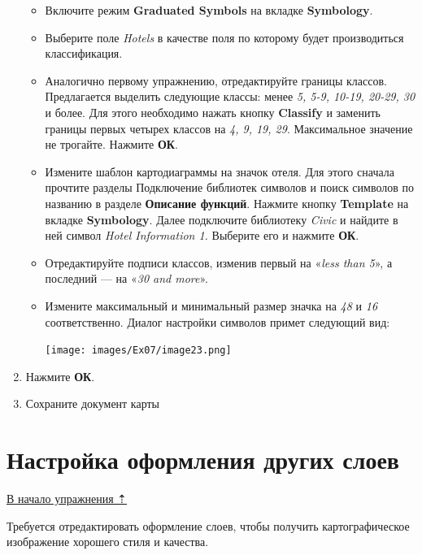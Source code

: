 \documentclass[12pt,]{book}
\begin{document}
\begin{enumerate}
  \begin{itemize}
  \item
    Включите режим \textbf{Graduated Symbols} на вкладке \textbf{Symbology}.
  \item
    Выберите поле \emph{Hotels} в качестве поля по которому будет производиться классификация.
  \item
    Аналогично первому упражнению, отредактируйте границы классов. Предлагается выделить следующие классы: менее \emph{5, 5-9, 10-19, 20-29, 30} и более. Для этого необходимо нажать кнопку \textbf{Classify} и заменить границы первых четырех классов на \emph{4, 9, 19, 29}. Максимальное значение не трогайте. Нажмите \textbf{ОК}.
  \item
    Измените шаблон картодиаграммы на значок отеля. Для этого сначала прочтите разделы Подключение библиотек символов и поиск символов по названию в разделе \textbf{Описание функций}. Нажмите кнопку \textbf{Template} на вкладке \textbf{Symbology}. Далее подключите библиотеку \emph{Civic} и найдите в ней символ \emph{Hotel Information 1.} Выберите его и нажмите \textbf{ОК}.
  \item
    Отредактируйте подписи классов, изменив первый на «\emph{less than 5}», а последний --- на «\emph{30 and more}».
  \item
    Измените максимальный и минимальный размер значка на \emph{48} и \emph{16} соответственно. Диалог настройки символов примет следующий вид:

    \texttt{[image: images/Ex07/image23.png]}
  \end{itemize}
\item
  Нажмите \textbf{ОК}.
\item
  Сохраните документ карты
\end{enumerate}

\hypertarget{map-ref-economic-other}{%
\section{Настройка оформления других слоев}\label{map-ref-economic-other}}

\protect\hyperlink{map-ref-economic}{В начало упражнения ⇡}

Требуется отредактировать оформление слоев, чтобы получить картографическое изображение хорошего стиля и качества.
\end{document}
